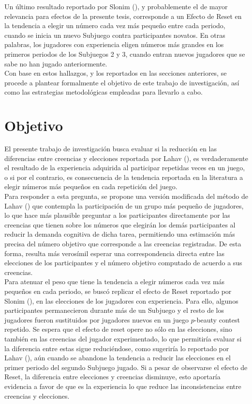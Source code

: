 Un último resultado reportado por Slonim (\citeyear{Slonim}), y probablemente el de mayor relevancia para efectos de la presente tesis, corresponde a un Efecto de Reset en la tendencia a elegir un número cada vez más pequeño entre cada periodo, cuando se inicia un nuevo Subjuego contra participantes novatos. En otras palabras, los jugadores con experiencia eligen números más grandes en los primeros periodos de los Subjuegos 2 y 3, cuando entran nuevos jugadores que se sabe no han jugado anteriormente.\\

Con base en estos hallazgos, y los reportados en las secciones anteriores, se procede a plantear formalmente el objetivo de este trabajo de investigación, así como las estrategias metodológicas empleadas para llevarlo a cabo. 

\section{Objetivo}

El presente trabajo de investigación busca evaluar si la reducción en las diferencias entre creencias y elecciones reportada por Lahav (\citeyear{Lahav}), es verdaderamente el resultado de la experiencia adquirida al participar repetidas veces en un juego, o si por el contrario, es consecuencia de la tendencia reportada en la literatura a elegir números más pequeños en cada repetición del juego.\\

Para responder a esta pregunta, se propone una versión modificada del método de Lahav (\citeyear{Lahav}) que contempla la participación de un grupo más pequeño de jugadores, lo que hace más plausible preguntar a los participantes directamente por las creencias que tienen sobre los números que elegirán los demás participantes al reducir la demanda cognitiva de dicha tarea, permitiendo una estimación más precisa del número objetivo que corresponde a las creencias registradas. De esta forma, resulta más verosímil esperar una correspondencia directa entre las elecciones de los participantes y el número objetivo computado de acuerdo a sus creencias.\\

Para atenuar el peso que tiene la tendencia a elegir números cada vez más pequeños en cada periodo, se buscó replicar el efecto de Reset reportado por Slonim (\citeyear{Slonim}), en las elecciones de los jugadores con experiencia. Para ello, algunos participantes permanecieron durante más de un Subjuego y el resto de los jugadores fueron sustituidos por jugadores nuevos en un juego $p$-beauty contest repetido. Se espera que el efecto de reset opere no sólo en las elecciones, sino también en las creencias del jugador experimentado, lo que permitiría evaluar si la diferencia entre estas sigue reduciéndose, como sugeriría lo reportado por Lahav (\citeyear{Lahav}), aún cuando se abandone la tendencia a reducir las elecciones en el primer periodo del segundo Subjuego jugado. Si a pesar de observarse el efecto de Reset, la diferencia entre elecciones y creencias disminuye, esto aportaría evidencia a favor de que es la experiencia lo que reduce las inconsistencias entre creencias y elecciones.\\

